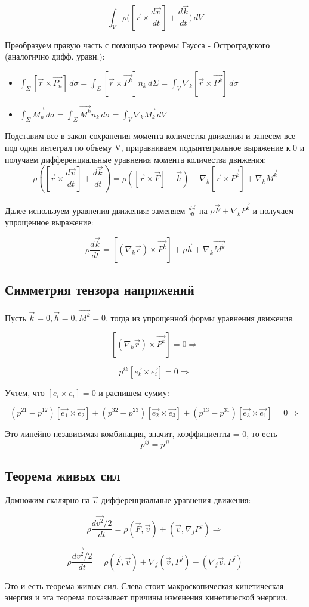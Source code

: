 $$\int_{V} \rho ([\vec{r} \times \frac{d\vec{v}}{dt}] +  \frac{d \vec{k}}{dt} \big ) \,dV  $$

Преобразуем правую часть с помощью теоремы Гаусса - Остроградского (аналогично дифф. уравн.): 

\begin{itemize}
    \item $\int_{\Sigma} [\vec{r} \times \vec{P_n}] \,d\sigma = \int_{\Sigma} [\vec{r} \times \vec{P^k}]n_k \,d\Sigma =  \int_{V} \nabla_k[\vec{r} \times \vec{P^k}] \,d\sigma  $

    \item $ \int_{\Sigma} \vec{M_n} \,d\sigma = \int_{\Sigma} \vec{M^k}n_k \,d\sigma = \int_{V} \nabla_k\vec{M_k} \,dV $
\end{itemize}

Подставим все в закон сохранения момента количества движения и занесем все под один интеграл по объему V, приравниваем подынтегральное выражение к 0 и получаем дифференциальные уравнения момента количества движения: 
$$ \rho ([\vec{r} \times \frac{d\vec{v}}{dt}] + \frac{d \vec{k}}{dt}) =   \rho ( [\vec{r} \times \vec{F}]  +  \vec{h} ) + \nabla_k[\vec{r} \times \vec{P^k}] + \nabla_k \vec{M^k}  $$

Далее используем уравнения движения: заменяем $\frac{d\vec{v}}{dt}$ на $\rho \vec{F}   +  \nabla_k \vec{P^k} $ и получаем упрощенное выражение: 

$$ \rho \frac{d \vec{k}}{dt} =  [(\nabla_k\vec{r}) \times \vec{P^k}] + \rho \vec{h} + \nabla_k \vec{M^k}  $$

\subsection{Симметрия тензора напряжений}
Пусть $\vec{k} = 0, \vec{h} = 0, \vec{M^k} = 0$, тогда из упрощенной формы уравнения движения: 

$$[(\nabla_k\vec{r}) \times \vec{P^k}] = 0 \Rightarrow $$

$$p^{ik}[\vec{e_k} \times  \vec{e_i}] = 0 \Rightarrow $$

Учтем, что $[e_i \times e_i ] = 0$ и распишем сумму: 

$$(p^{21} - p^{12}) [\vec{e_1} \times  \vec{e_2}] + (p^{32} - p^{23}) [\vec{e_2} \times  \vec{e_3}] + (p^{13} - p^{31}) [\vec{e_3} \times  \vec{e_1}]= 0 \Rightarrow $$ 

Это линейно независимая комбинация, значит, коэффициенты = 0, то  есть 
$$p^{ij} = p^{ji} $$

\subsection{Теорема живых сил}
Домножим скалярно на $\vec{v}$ дифференциальные уравнения движения: 

$$\rho \frac{d \vec{v^2}/2}{dt} =  \rho (\vec{F}, \vec{v})   +  (\vec{v}, \nabla_j P^j) \Rightarrow $$

$$\rho \frac{d \vec{v^2}/2}{dt} =  \rho (\vec{F}, \vec{v})   +  
 \nabla_j (\vec{v},  P^j) -  (\nabla_j \vec{v},  P^j)$$

Это и есть теорема живых сил. Слева стоит макроскопическая кинетическая энергия и эта теорема показывает причины изменения кинетической энергии.

